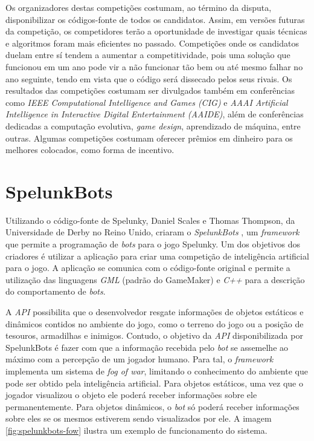 Os organizadores destas competições costumam, ao término da disputa,
disponibilizar os códigos-fonte de todos os candidatos. Assim, em versões
futuras da competição, os competidores terão a oportunidade de investigar quais
técnicas e algoritmos foram mais eficientes no passado. Competições onde os
candidatos duelam entre sí tendem a aumentar a competitividade, pois uma
solução que funcionou em um ano pode vir a não funcionar tão bem ou até mesmo
falhar no ano seguinte, tendo em vista que o código será dissecado pelos seus
rivais. Os resultados das competições costumam ser divulgados também em
conferências como \textit{IEEE Computational Intelligence and Games (CIG)} e
\textit{AAAI Artificial Intelligence in Interactive Digital Entertainment
(AAIDE)}, além de conferências dedicadas a computação evolutiva, \textit{game
design}, aprendizado de máquina, entre outras. Algumas competições costumam
oferecer prêmios em dinheiro para os melhores colocados, como forma de
incentivo.


\section{SpelunkBots}
Utilizando o código-fonte de Spelunky, Daniel Scales e Thomas Thompson, da
Universidade de Derby no Reino Unido, criaram o \textit{SpelunkBots}
\cite{SPELUNKBOTSWEB}, um \textit{framework} que permite a programação de
\textit{bots} para o jogo Spelunky. Um dos objetivos dos criadores é utilizar a
aplicação para criar uma competição de inteligência artificial para o jogo. A
aplicação se comunica com o código-fonte original e permite a utilização das
linguagens \textit{GML} (padrão do GameMaker) e \textit{C++} para a descrição
do comportamento de \textit{bots}.

A \textit{API} possibilita que o desenvolvedor resgate informações de objetos
estáticos e dinâmicos contidos no ambiente do jogo, como o terreno do jogo ou a
posição de tesouros, armadilhas e inimigos. Contudo, o objetivo da \textit{API}
disponibilizada por SpelunkBots é fazer com que a informação recebida pelo
\textit{bot} se assemelhe ao máximo com a percepção de um jogador humano.  Para
tal, o \textit{framework} implementa um sistema de \textit{fog of war},
limitando o conhecimento do ambiente que pode ser obtido pela inteligência
artificial.  Para objetos estáticos, uma vez que o jogador visualizou o objeto
ele poderá receber informações sobre ele permanentemente. Para objetos
dinâmicos, o \textit{bot} só poderá receber informações sobre eles se os mesmos
estiverem sendo visualizados por ele. A imagem \ref{fig:spelunkbots-fow} ilustra
um exemplo de funcionamento do sistema.

